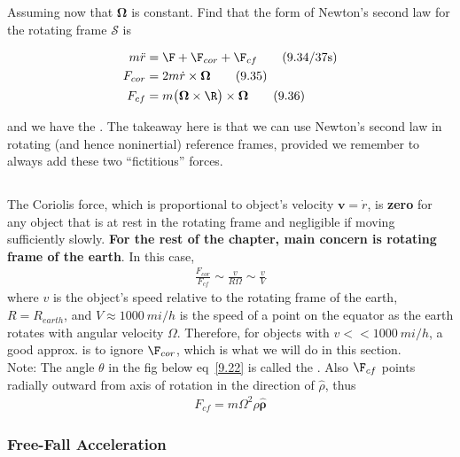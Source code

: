 \documentclass[10pt, twocolumn]{article}
\DeclareRobustCommand{\mybox}[2][gray!20]{%
	\begin{tcolorbox}[   %
		breakable,
		left=0pt,
		right=0pt,
		top=-13pt,
		bottom=0pt,
		colback=#1,
		colframe=#1,
		width=0.45\dimexpr\textwidth\relax,
		enlarge left by=0mm,
		boxsep=1pt,
		arc=0pt,outer arc=0pt,
		]
		#2
	\end{tcolorbox}
}
\newcommand\graybox[1]{ \mybox[gray!20]{\begin{align}#1\end{align}} }
\newcommand{\myspace}{\vspace{3\bigskipamount}}
\newcommand\p{\Needspace{10\baselineskip} \noindent}
\newcommand\s{\mathcal{S}}
\newcommand{\rdot}{\dot{r}}
\newcommand{\rddot}{\ddot{r}}
\newcommand\tlab[1]{\tag{#1}\label{#1}}
\begin{document}
\p Assuming now that $\bm{\Omega}$ is constant. Find that the form of Newton's second law for the rotating frame $\s$ is
\graybox{ m\rddot &= \F + \F_{cor} + \F_{cf} \tlab{9.34/37s} \\
	   F_{cor} &= 2m\rdot \times \bm{\Omega}  \tlab{9.35} \\  
	F_{cf} &= m \big( \bm{\Omega} \times \R \big) \times \bm{\Omega} \tlab{9.36}  }

\p and we have the . The takeaway here is that we can use Newton's second law in rotating (and hence noninertial) reference frames, provided we remember to always add these two ``fictitious'' forces. 
\myspace

\subsection{}

\p The Coriolis force, which is proportional to object's velocity $\bm{v} = \rdot$, is \textbf{zero} for any object that is at rest in the rotating frame and negligible if moving sufficiently slowly. \textbf{For the rest of the chapter, main concern is rotating frame of the earth}. In this case, 
\begin{align}
	\frac{F_{cor}}{F_{cf}} \sim \frac{v}{R \Omega} \sim \frac{v}{V} \tlab{9.38}
\end{align}
where $v$ is the object's speed relative to the rotating frame of the earth, $R = R_{earth}$, and $V \approx 1000~mi/h$ is the speed of a point on the equator as the earth rotates with angular velocity $\Omega$. Therefore, for objects with $v << 1000~mi/h$, a good approx. is to ignore $\F_{cor}$, which is what we will do in this section. \\

\p Note: The angle $\theta$ in the fig below eq~\ref{9.22} is called the . Also $\F_{cf}$ points radially outward from axis of rotation in the direction of $\hat{\rho}$, thus
\begin{align}
	F_{cf} = m \Omega^2 \rho \hat{\bm{\rho}} \tlab{9.40}
\end{align}

\subsubsection{Free-Fall Acceleration}
\end{document}
